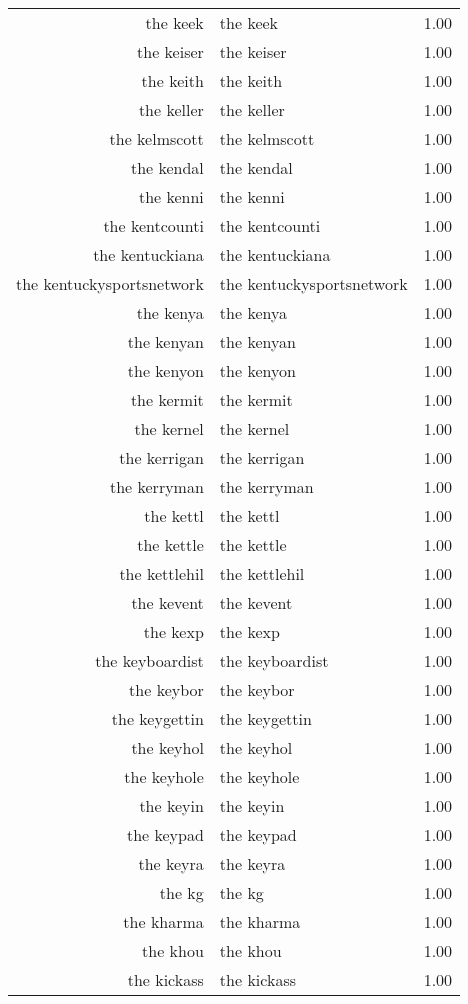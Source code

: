 \begin{table}[ht]
\begin{tabular}{rlr}
  the keek & the keek & 1.00 \\ 
  the keiser & the keiser & 1.00 \\ 
  the keith & the keith & 1.00 \\ 
  the keller & the keller & 1.00 \\ 
  the kelmscott & the kelmscott & 1.00 \\ 
  the kendal & the kendal & 1.00 \\ 
  the kenni & the kenni & 1.00 \\ 
  the kentcounti & the kentcounti & 1.00 \\ 
  the kentuckiana & the kentuckiana & 1.00 \\ 
  the kentuckysportsnetwork & the kentuckysportsnetwork & 1.00 \\ 
  the kenya & the kenya & 1.00 \\ 
  the kenyan & the kenyan & 1.00 \\ 
  the kenyon & the kenyon & 1.00 \\ 
  the kermit & the kermit & 1.00 \\ 
  the kernel & the kernel & 1.00 \\ 
  the kerrigan & the kerrigan & 1.00 \\ 
  the kerryman & the kerryman & 1.00 \\ 
  the kettl & the kettl & 1.00 \\ 
  the kettle & the kettle & 1.00 \\ 
  the kettlehil & the kettlehil & 1.00 \\ 
  the kevent & the kevent & 1.00 \\ 
  the kexp & the kexp & 1.00 \\ 
  the keyboardist & the keyboardist & 1.00 \\ 
  the keybor & the keybor & 1.00 \\ 
  the keygettin & the keygettin & 1.00 \\ 
  the keyhol & the keyhol & 1.00 \\ 
  the keyhole & the keyhole & 1.00 \\ 
  the keyin & the keyin & 1.00 \\ 
  the keypad & the keypad & 1.00 \\ 
  the keyra & the keyra & 1.00 \\ 
  the kg & the kg & 1.00 \\ 
  the kharma & the kharma & 1.00 \\ 
  the khou & the khou & 1.00 \\ 
  the kickass & the kickass & 1.00 \\ 

\end{tabular}
\end{table}
